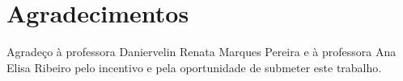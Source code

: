 \documentclass[portuguese]{textolivre}
\begin{document}
\printbibliography\label{sec-bib}

\section*{\fontsize{10}{12}\selectfont Agradecimentos}
Agradeço à professora Daniervelin Renata Marques Pereira e à professora Ana Elisa Ribeiro pelo incentivo e pela oportunidade de submeter este trabalho.

\begin{dataavailability}
\end{dataavailability}
\end{document}
